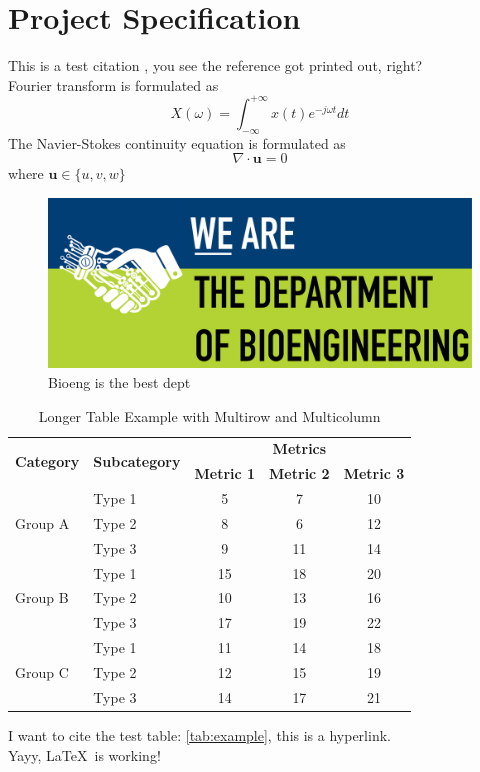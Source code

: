 \newpage

\section{Project Specification}


This is a test citation \cite{oreo}, you see the reference got printed out, right? \\

Fourier transform is formulated as
\[
    X(\omega) = \int_{-\infty}^{+\infty} x(t)e^{-j\omega t} dt
\]
The Navier-Stokes continuity equation is formulated as
\[
    \nabla \cdot \mathbf{u} = 0
\]
where $\bm{u} \in \{u, v, w\}$ \\

\begin{figure}[H]
    \centering
    \includegraphics{figures/Bioeng.png}
    \caption{Bioeng is the best dept}
    \label{fig:my_label}
\end{figure}

\begin{table}[h]
\centering
\begin{tabular}{llccc}
\toprule
\multirow{2}{*}{\textbf{Category}} & \multirow{2}{*}{\textbf{Subcategory}} & \multicolumn{3}{c}{\textbf{Metrics}} \\ \cmidrule(lr){3-5}
&& \textbf{Metric 1} & \textbf{Metric 2} & \textbf{Metric 3} \\ \midrule
    \multirow{3}{*}{Group A}
    & Type 1& 5& 7& 10\\
    & Type 2& 8& 6& 12\\
    & Type 3& 9& 11& 14\\ 
    \midrule
    \multirow{3}{*}{Group B}
    & Type 1& 15& 18& 20\\
    & Type 2& 10& 13& 16\\
    & Type 3& 17& 19& 22\\ 
    \midrule
    \multirow{3}{*}{Group C}
    & Type 1& 11& 14& 18\\
    & Type 2& 12& 15& 19\\
    & Type 3& 14& 17& 21\\ 
    \bottomrule
\end{tabular}
\caption{Longer Table Example with Multirow and Multicolumn}
\label{tab:example}
\end{table}

I want to cite the test table: \autoref{tab:example}, this is a hyperlink. \\

Yayy, \LaTeX \ is working!
